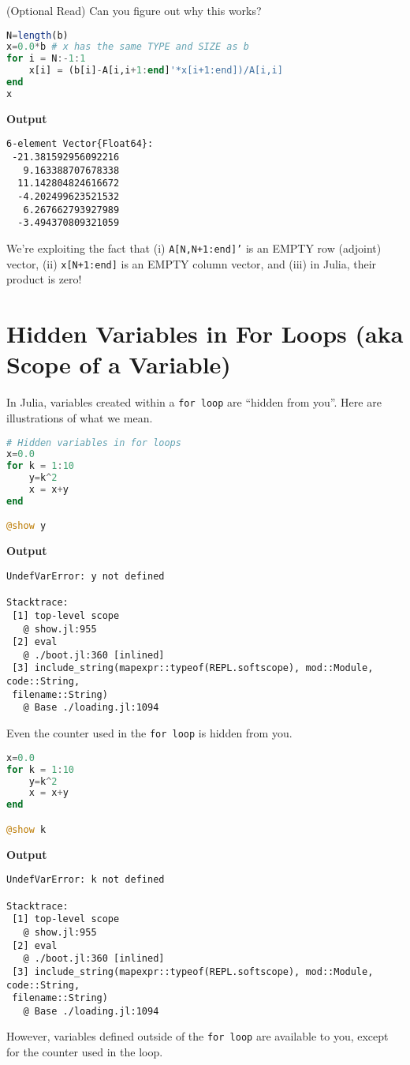 \begin{rem} (Optional Read) Can you figure out why this works?
\begin{lstlisting}[language=Julia,style=mystyle]
N=length(b)
x=0.0*b # x has the same TYPE and SIZE as b
for i = N:-1:1
    x[i] = (b[i]-A[i,i+1:end]'*x[i+1:end])/A[i,i]
end
x
\end{lstlisting}
\textbf{Output} 
\begin{verbatim}
6-element Vector{Float64}:
 -21.381592956092216
   9.163388707678338
  11.142804824616672
  -4.202499623521532
   6.267662793927989
  -3.494370809321059
\end{verbatim}
We're exploiting the fact that (i) \texttt{A[N,N+1:end]'} is an EMPTY row (adjoint) vector, (ii)  \texttt{x[N+1:end]} is an EMPTY column vector, and (iii) in Julia, their product is zero!
\end{rem}

\section{Hidden Variables in For Loops (aka Scope of a Variable)}

In Julia, variables created within a \texttt{for\,loop} are ``hidden from you''. Here are illustrations of what we mean.

\begin{lstlisting}[language=Julia,style=mystyle]
# Hidden variables in for loops
x=0.0
for k = 1:10
    y=k^2
    x = x+y
end

@show y
\end{lstlisting}
\textbf{Output} 
\begin{verbatim}
UndefVarError: y not defined

Stacktrace:
 [1] top-level scope
   @ show.jl:955
 [2] eval
   @ ./boot.jl:360 [inlined]
 [3] include_string(mapexpr::typeof(REPL.softscope), mod::Module, code::String,
 filename::String)
   @ Base ./loading.jl:1094
\end{verbatim}

Even the counter used in the  \texttt{for\,loop} is hidden from you.

\begin{lstlisting}[language=Julia,style=mystyle]
x=0.0
for k = 1:10
    y=k^2
    x = x+y
end

@show k
\end{lstlisting}
\textbf{Output} 
\begin{verbatim}
UndefVarError: k not defined

Stacktrace:
 [1] top-level scope
   @ show.jl:955
 [2] eval
   @ ./boot.jl:360 [inlined]
 [3] include_string(mapexpr::typeof(REPL.softscope), mod::Module, code::String,
 filename::String)
   @ Base ./loading.jl:1094
\end{verbatim}
However, variables defined outside of the \texttt{for\,loop} are available to you, except for the counter used in the loop.\\

